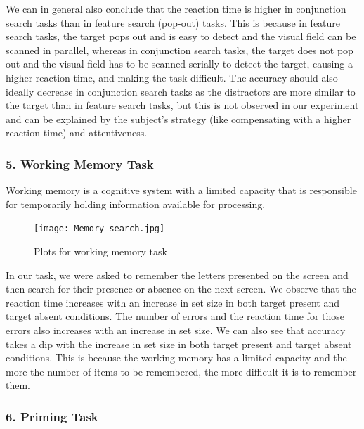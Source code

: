 \documentclass{report}
\begin{document}
\vspace{1cm}

We can in general also conclude that the reaction time is higher in 
conjunction search tasks than in feature search (pop-out) tasks. This is because 
in feature search tasks, the target pops out and is easy to detect and 
the visual field can be scanned in parallel, whereas in conjunction 
search tasks, the target does not pop out and the visual field has to be 
scanned serially to detect the target, causing a higher reaction time, 
and making the task difficult. The accuracy should also ideally 
decrease in conjunction search tasks as the distractors are more 
similar to the target than in feature search tasks, but this is not 
observed in our experiment and can be explained by the subject's 
strategy (like compensating with a higher reaction time) and 
attentiveness.


\subsubsection{5. Working Memory Task}

Working memory is a cognitive system with a limited capacity 
that is responsible for temporarily holding information available 
for processing. 

\begin{figure}[htbp]  
  \centering 
  \texttt{[image: Memory-search.jpg]} 
  \caption{Plots for working memory task}
  \label{fig: working memory} 
\end{figure}

In our task, we were asked to remember the letters presented on 
the screen and then search for their presence or absence on the 
next screen. We observe that the reaction time increases with an 
increase in set size in both target present and target absent conditions. 
The number of errors and the reaction time for those errors also increases with an 
increase in set size. We can also see that accuracy takes a dip with the increase 
in set size in both target present and target absent conditions. 
This is because the working memory has a limited 
capacity and the more the number of items to be remembered, the more difficult 
it is to remember them.



\subsubsection{6. Priming Task}
\end{document}
